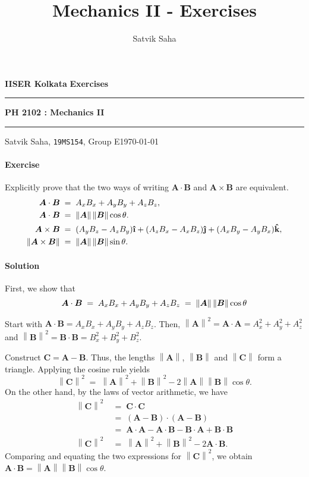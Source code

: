 \documentclass[10pt]{article}
\title{Mechanics II - Exercises}
\author{Satvik Saha}
\date{}
\let\vec\boldsymbol
\newcommand{\uveci}{{\bm{\hat{\textnormal{\bfseries\i}}}}}
\newcommand{\uvecj}{{\bm{\hat{\textnormal{\bfseries\j}}}}}
\newcommand{\uveck}{{\bm{\hat{\textnormal{\bfseries k}}}}}
\newcommand\norm[1]{\left\lVert#1\right\rVert}
\newcounter{prob}
\def\problem{\stepcounter{prob}\paragraph{Exercise \arabic{prob}}}
\def\solution{\paragraph{Solution}}
\begin{document}
        \par\textbf{IISER Kolkata} \hfill \textbf{Exercises}
        \vspace{3pt}
        \hrule
        \vspace{3pt}
        \begin{center}
                \LARGE{\textbf{PH 2102 : Mechanics II}}
        \end{center}
        \vspace{3pt}
        \hrule
        \vspace{3pt}
        Satvik Saha, \texttt{19MS154}, Group E\hfill\today
        \vspace{20pt}

        \problem Explicitly prove that the two ways of writing $\vec{A}\cdot\vec{B}$ and $\vec{A}\times\vec{B}$ are equivalent.
        \begin{align*}
                \vec{A}\cdot\vec{B} \;&=\; A_xB_x + A_yB_y + A_zB_z, \\
                \vec{A}\cdot\vec{B} \;&=\; \norm{\vec{A}} \norm{\vec{B}}\cos\theta. \\
                \vec{A}\times\vec{B} \;&=\; (A_yB_z - A_zB_y)\uveci + (A_zB_x - A_xB_z)\uvecj + (A_xB_y - A_y B_x)\uveck, \\
                \norm{\vec{A}\times\vec{B}} \;&=\; \norm{\vec{A}} \norm{\vec{B}} \sin\theta.
        \end{align*}

        \solution First, we show that
        \[
                \vec{A}\cdot\vec{B}  \;=\; A_xB_x + A_yB_y + A_zB_z \;=\; \norm{\vec{A}}\norm{\vec{B}} \cos\theta \\
        \]
        
        Start with $\vec{A}\cdot\vec{B} = A_xB_x + A_yB_y + A_zB_z$.
        Then, $\norm{\vec{A}}^2 = \vec{A}\cdot\vec{A} = A_x^2 + A_y^2 + A_z^2$ and $\norm{\vec{B}}^2 = \vec{B}\cdot\vec{B} = B_x^2 + B_y^2 + B_z^2$.

        Construct $\vec{C} = \vec{A} - \vec{B}$. Thus, the lengths $\norm{\vec{A}}$, $\norm{\vec{B}}$ and $\norm{\vec{C}}$ form a triangle.
        Applying the cosine rule yields
        \[
        \norm{\vec{C}}^2 \;=\; \norm{\vec{A}}^2 + \norm{\vec{B}}^2 - 2\norm{\vec{A}}\norm{\vec{B}}\cos\theta.
        \]
        On the other hand, by the laws of vector arithmetic, we have
        \begin{align*}
                \norm{\vec{C}}^2 \;&=\; \vec{C}\cdot\vec{C} \\
                        \;&=\; (\vec{A} - \vec{B})\cdot(\vec{A} - \vec{B}) \\
                        \;&=\; \vec{A}\cdot\vec{A} - \vec{A}\cdot\vec{B} - \vec{B}\cdot\vec{A} + \vec{B}\cdot\vec{B} \\
                \norm{\vec{C}}^2 \;&=\; \norm{\vec{A}}^2 + \norm{\vec{B}}^2 - 2\vec{A}\cdot\vec{B}.
        \end{align*}
        Comparing and equating the two expressions for $\norm{\vec{C}}^2$, we obtain $\vec{A}\cdot\vec{B} = \norm{\vec{A}}\norm{\vec{B}}\cos\theta$.
\end{document}
